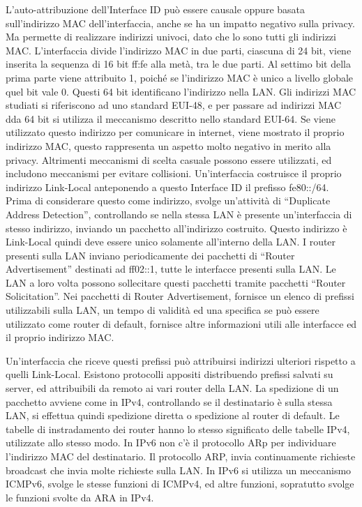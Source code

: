 \documentclass{article}
\numberwithin{equation}{subsection}
\begin{document}
L'auto-attribuzione dell'Interface ID può essere causale oppure basata sull'indirizzo MAC dell'interfaccia, anche se ha un impatto negativo sulla privacy. Ma permette di 
realizzare indirizzi univoci, dato che lo sono tutti gli indirizzi MAC. L'interfaccia divide l'indirizzo MAC in due parti, ciascuna di 24 bit, 
viene inserita la sequenza di 16 bit ff:fe alla metà, tra le due parti. Al settimo bit della prima parte viene attribuito 1, poiché se l'indirizzo MAC è unico a livello 
globale quel bit vale 0. Questi 64 bit identificano l'indirizzo nella LAN. Gli indirizzi MAC studiati si riferiscono ad uno standard EUI-48, e per passare ad indirizzi 
MAC dda 64 bit si utilizza il meccanismo descritto nello standard EUI-64. 
Se viene utilizzato questo indirizzo per comunicare in internet, viene mostrato il proprio indirizzo MAC, questo rappresenta un aspetto molto negativo in merito alla 
privacy. Altrimenti meccanismi di scelta casuale possono essere utilizzati, ed includono meccanismi per evitare collisioni. 
Un'interfaccia costruisce il proprio indirizzo Link-Local anteponendo a questo Interface ID il prefisso fe80::/64. 
Prima di considerare questo come indirizzo, svolge un'attività di ``Duplicate Address Detection'', controllando se nella stessa LAN è presente un'interfaccia 
di stesso indirizzo, inviando un pacchetto all'indirizzo costruito. Questo indirizzo è Link-Local quindi deve essere unico solamente all'interno della LAN. 
I router presenti sulla LAN inviano periodicamente dei pacchetti di ``Router Advertisement'' destinati ad ff02::1, tutte le interfacce presenti sulla LAN. Le LAN 
a loro volta possono sollecitare questi pacchetti tramite pacchetti ``Router Solicitation''. 
Nei pacchetti di Router Advertisement, fornisce un elenco di prefissi utilizzabili sulla LAN, un tempo di validità ed una specifica se può essere utilizzato come 
router di default, fornisce altre informazioni utili alle interfacce ed il proprio indirizzo MAC. 

Un'interfaccia che riceve questi prefissi può attribuirsi indirizzi ulteriori rispetto a quelli Link-Local. 
Esistono protocolli appositi distribuendo prefissi salvati su server, ed attribuibili da remoto ai vari router della LAN. 
La spedizione di un pacchetto avviene come in IPv4, controllando se il destinatario è sulla stessa LAN, si effettua quindi spedizione diretta o spedizione 
al router di default. 
Le tabelle di instradamento dei router hanno lo stesso significato delle tabelle IPv4, utilizzate allo stesso modo. In IPv6 non c'è il protocollo ARp per individuare 
l'indirizzo MAC del destinatario. Il protocollo ARP, invia continuamente richieste broadcast che invia molte richieste sulla LAN. In IPv6 si utilizza 
un meccanismo ICMPv6, svolge le stesse funzioni di ICMPv4, ed altre funzioni, sopratutto svolge le funzioni svolte da ARA in IPv4. 
\end{document}
